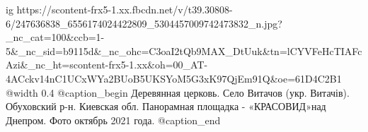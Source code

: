  
 
 
 
 

\ifcmt
  ig https://scontent-frx5-1.xx.fbcdn.net/v/t39.30808-6/247636838_6556174024422809_5304457009742473832_n.jpg?_nc_cat=100&ccb=1-5&_nc_sid=b9115d&_nc_ohc=C3oaI2tQb9MAX_DtUuk&tn=lCYVFeHcTIAFcAzi&_nc_ht=scontent-frx5-1.xx&oh=00_AT-4ACckv14nC1UCxWYa2BUoB5UKSYoM5G3xK97QjEm91Q&oe=61D4C2B1
  @width 0.4
  @caption_begin
    Деревянная церковь.
    Село Витачов (укр. Витачів). Обуховский р-н. Киевская обл. 
    Панорамная площадка - «КРАСОВИД»над Днепром. Фото октябрь 2021 года.
  @caption_end
\fi
